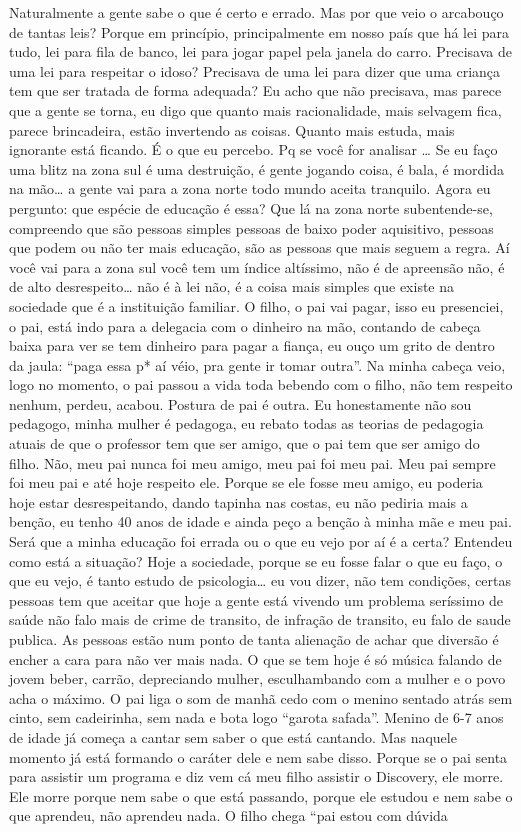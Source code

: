 \documentclass[
	12pt,				%
	openright,			%
	twoside,			%
	a4paper,			%
	chapter=TITLE,		%
	section=TITLE,		%
	subsection=TITLE,	%
	subsubsection=TITLE,%
	spanish,            %
	english,			%
	brazil				%
	]{abntex2}
\begin{document}
\begin{anexosenv}
	Naturalmente a gente sabe o que é certo e errado. Mas por que veio o arcabouço de tantas leis? Porque em princípio, principalmente em nosso país que há lei para tudo, lei para fila de banco, lei para jogar papel pela janela do carro. Precisava de uma lei para respeitar o idoso? Precisava de uma lei para dizer que uma criança tem que ser tratada de forma adequada?  Eu acho que não precisava, mas parece que a gente se torna, eu digo que quanto mais racionalidade, mais selvagem fica, parece brincadeira, estão invertendo as coisas. Quanto mais estuda, mais ignorante está ficando. É o que eu percebo. Pq se você for analisar … Se eu faço uma blitz na zona sul  é uma destruição, é gente jogando coisa, é bala, é mordida na mão… a gente vai para a zona norte todo mundo aceita tranquilo.  Agora eu pergunto: que espécie de educação é essa? Que lá na zona norte subentende-se, compreendo que são pessoas simples pessoas de baixo poder aquisitivo, pessoas que podem ou não ter mais educação, são as pessoas que mais seguem a regra. Aí você vai para a zona sul você tem um índice altíssimo, não é de apreensão não,  é de alto desrespeito… não é à lei não, é a coisa mais simples que existe na sociedade que é a instituição familiar. O filho, o pai vai pagar, isso eu presenciei, o pai, está indo para a delegacia com o dinheiro na mão, contando de cabeça baixa para ver se tem dinheiro para pagar a fiança, eu ouço um grito de dentro da jaula: “paga essa p* aí véio, pra gente ir tomar outra”. Na minha cabeça veio, logo no momento,  o pai passou a vida toda bebendo com o filho, não tem respeito nenhum, perdeu, acabou. Postura de pai é outra. Eu honestamente não sou pedagogo, minha mulher  é pedagoga, eu rebato todas as teorias de pedagogia atuais de que o professor tem que ser amigo, que o pai tem que ser amigo do filho. Não, meu pai nunca foi meu amigo, meu pai foi meu pai. Meu pai sempre foi meu pai e até hoje respeito ele. Porque se ele fosse meu amigo, eu poderia hoje estar desrespeitando, dando tapinha nas costas, eu não pediria mais a benção, eu tenho 40 anos de idade e ainda peço a benção à minha mãe e meu pai.	Será que a minha educação foi errada ou o que eu vejo por aí é a certa?  Entendeu como está a situação? Hoje a sociedade, porque se eu fosse falar o que eu faço, o que eu vejo, é tanto estudo de psicologia… eu vou dizer, não tem condições, certas pessoas tem que aceitar que hoje  a gente está vivendo um problema seríssimo de saúde não falo mais de crime de transito, de infração de transito, eu falo de saude publica. As pessoas estão num ponto de tanta alienação de achar que diversão é encher a cara para não ver mais nada. O que se tem hoje é só música falando de jovem beber, carrão, depreciando mulher, esculhambando com a mulher e o povo acha o máximo. O pai liga o som de manhã cedo com o menino sentado atrás sem cinto, sem cadeirinha, sem nada e bota logo “garota safada”. Menino de 6-7 anos de idade já começa a cantar sem saber o que está cantando. Mas naquele momento já está formando o caráter dele e nem sabe disso. Porque se o pai senta para assistir um programa e diz vem cá meu filho assistir o Discovery, ele morre.  Ele morre porque nem sabe o que está passando, porque ele estudou e nem sabe o que aprendeu, não aprendeu nada. O filho chega “pai estou com dúvida 
\end{anexosenv}
\end{document}

